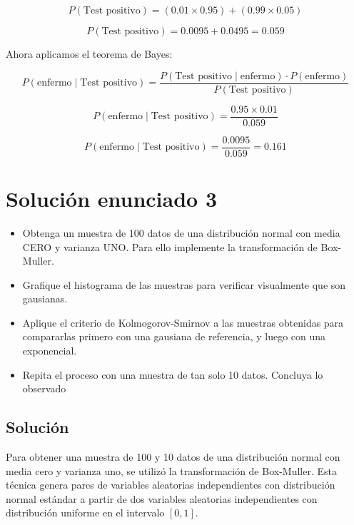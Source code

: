 \documentclass[a4paper,12pt]{article}
\begin{document}
	 \[
	 P(\text{Test positivo}) = (0.01 \times 0.95) + (0.99 \times 0.05)
	 \]
	 
	 \[
	 P(\text{Test positivo}) = 0.0095 + 0.0495 = 0.059
	 \]
	 
	 Ahora aplicamos el teorema de Bayes:
	 
	 \[
	 P(\text{enfermo} \mid \text{Test positivo}) = \frac{P(\text{Test positivo} \mid \text{enfermo}) \cdot P(\text{enfermo})}{P(\text{Test positivo})}
	 \]
	 
	 \[
	 P(\text{enfermo} \mid \text{Test positivo}) = \frac{0.95 \times 0.01}{0.059}
	 \]
	 
	 \[
	 P(\text{enfermo} \mid \text{Test positivo}) = \frac{0.0095}{0.059} = 0.161
	 \]
	
	
	
	\section{Soluci\'on enunciado 3}
	
	
	\begin{itemize}
		\item Obtenga un muestra de 100 datos de una distribución normal con media
		CERO y varianza UNO.  Para ello implemente la transformación de Box-Muller.
		\item Grafique el histograma de las muestras para verificar visualmente que son gausianas.
		\item Aplique el criterio de Kolmogorov-Smirnov a las muestras obtenidas para compararlas primero con una gausiana de referencia, y luego con una exponencial.
		\item Repita el proceso con una muestra de tan solo 10 datos. Concluya lo observado
	\end{itemize}
	
	
	
	
	\subsection{Soluci\'on}
	
	Para obtener una muestra de 100 y 10 datos de una distribuci\'on normal con media cero y varianza uno, se utiliz\'o la transformaci\'on de Box-Muller. Esta t\'ecnica genera pares de variables aleatorias independientes con distribuci\'on normal est\'andar a partir de dos variables aleatorias independientes con distribuci\'on uniforme en el intervalo $[0, 1]$.
	
\end{document}

